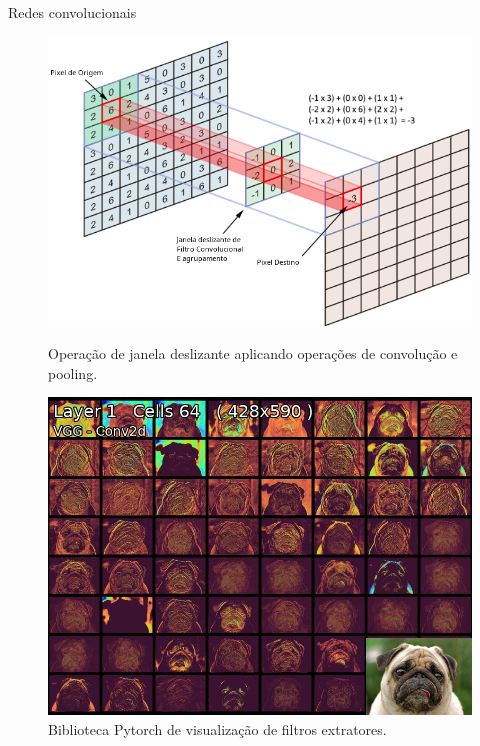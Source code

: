 \documentclass[8pt]{beamer}
\begin{document}
\begin{frame}{Redes convolucionais}
    
    \begin{figure}[!ht]
        \centering
            \begin{minipage}{0.45\textwidth}
                \includegraphics[width=\columnwidth]{Imagens/operacao_conv.png}
                \caption{Operação de janela deslizante aplicando operações de convolução e pooling.}
            \end{minipage}
            \begin{minipage}{0.45\textwidth}
                \includegraphics[width=\columnwidth]{Imagens/mapextrackt.jpg}
                \caption{Biblioteca Pytorch de visualização de filtros extratores.}
            \end{minipage}
        \end{figure}  
        

\end{frame}
\end{document}
